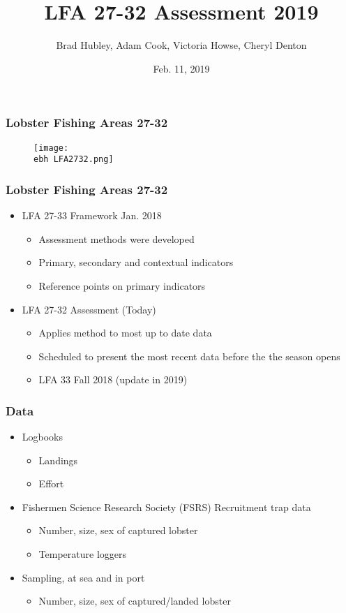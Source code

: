 \documentclass{beamer}
\title[LFA 27-32]{LFA 27-32 Assessment 2019}
\author[Hubley, Cook, Howse and Denton]{Brad Hubley, Adam Cook, Victoria Howse, Cheryl Denton}
\institute[DFO]{Science Branch, Fisheries and Oceans Canada}
\date{Feb. 11, 2019}
\newcommand{\ebh}{\string~/bio.data/bio.lobster/figures/Assessment/LFA2732/} %
\begin{document}
 
\frame{\titlepage}
 


\begin{frame}
\frametitle{Lobster Fishing Areas 27-32}
\begin{figure}
        \begin{center}
            \texttt{[image: \\ebh LFA2732.png]}
        \end{center}
    \end{figure}
\end{frame}


\begin{frame}
\frametitle{Lobster Fishing Areas 27-32}
\begin{itemize}
\setlength\itemsep{1em}    
\item LFA 27-33 Framework Jan. 2018 
\begin{itemize}
\item Assessment methods were developed
\item Primary, secondary and contextual indicators
\item Reference points on primary indicators
\end{itemize}
\item LFA 27-32 Assessment (Today)
\begin{itemize}
\item Applies method to most up to date data
\item Scheduled to present the most recent data before the the season opens
\item LFA 33 Fall 2018 (update in 2019)
\end{itemize}
\end{itemize}

\end{frame}


\begin{frame}
\frametitle{Data}
\begin{itemize}
\setlength\itemsep{1em}    
\item Logbooks 
\begin{itemize}
\item Landings
\item Effort
\end{itemize}
\item Fishermen Science Research Society (FSRS) Recruitment trap data
\begin{itemize}
\item Number, size, sex of captured lobster
\item Temperature loggers
\end{itemize}
\item Sampling, at sea and in port
\begin{itemize}
\item Number, size, sex of captured/landed lobster
\end{itemize}
\end{itemize}

\end{frame}
\end{document}
